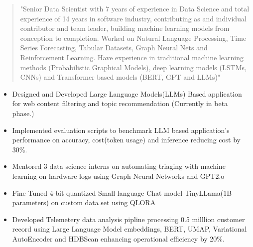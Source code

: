 \documentclass[10pt,a4paper,ragged2e,withhyper]{altacv}
\author{Gaurav Sood}
\date{\today}
\title{}
\begin{document}

\makecvheader

\begin{paracol}{1}
 \begin{quote}
"Senior Data Scientist with 7 years of experience in Data Science and total experience of 14 years in software industry, contributing as and individual contributor and team leader, building machine learning models from conception to completion. Worked on  Natural Language Processing, Time Series Forecasting, Tabular Datasets, Graph Neural Nets and  Reinforcement Learning.  Have experience in traditional machine learning methods (Probabilistic Graphical Models), deep learning models (LSTMs, CNNs) and Transformer based models (BERT, GPT and LLMs)"
 \end{quote}
\label{sec:orgfa314bf}


\divider

\divider


\label{sec:orgc072cc9}

\begin{itemize}
\item Designed and Developed Large Language Models(LLMs) Based application for web content
filtering and topic recommendation (Currently in beta phase.)
\item Implemented evaluation scripts to benchmark LLM based application's performance on
accuracy, cost(token usage) and inference reducing cost by 30\%.
\item Mentored 3 data science interns on automating triaging with machine learning
on hardware logs using Graph Neural Networks and GPT2.o
\item Fine Tuned 4-bit quantized Small language Chat model TinyLLama(1B parameters) on custom data set using QLORA
\item Developed Telemetery data analysis pipline processing 0.5 milllion customer record using Large Language Model
embeddings, BERT, UMAP, Variational AutoEncoder and HDBScan enhancing operational efficiency by 20\%.
\end{itemize}


\end{paracol}
\end{document}
